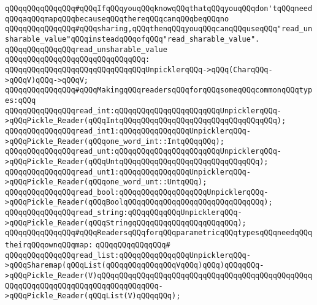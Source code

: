 \newline
\newline
\verb|qQQqqQQqqQQqqQQq#qQQqIfqQQqyouqQQqknowqQQqthatqQQqyouqQQqdon'tqQQqneedqQQqaqQQqmapqQQqbecauseqQQqthereqQQqcanqQQqbeqQQqno|\newline
\verb|qQQqqQQqqQQqqQQq#qQQqsharing,qQQqthenqQQqyouqQQqcanqQQquseqQQq"read_unsharable_value"qQQqinsteadqQQqofqQQq"read_sharable_value".|\newline
\newline
\verb|qQQqqQQqqQQqqQQqread_unsharable_value|\newline
\verb|qQQqqQQqqQQqqQQqqQQqqQQqqQQqqQQq:|\newline
\verb|qQQqqQQqqQQqqQQqqQQqqQQqqQQqqQQqUnpicklerqQQq->qQQq(CharqQQq->qQQqV)qQQq->qQQqV;|\newline
\newline
\newline
\verb|qQQqqQQqqQQqqQQq#qQQqMakingqQQqreadersqQQqforqQQqsomeqQQqcommonqQQqtypes:qQQq|\newline
\newline
\verb|qQQqqQQqqQQqqQQqread_int:qQQqqQQqqQQqqQQqqQQqqQQqUnpicklerqQQq->qQQqPickle_Reader(qQQqIntqQQqqQQqqQQqqQQqqQQqqQQqqQQqqQQqqQQq);|\newline
\verb|qQQqqQQqqQQqqQQqread_int1:qQQqqQQqqQQqqQQqUnpicklerqQQq->qQQqPickle_Reader(qQQqone_word_int::IntqQQqqQQq);|\newline
\verb|qQQqqQQqqQQqqQQqread_unt:qQQqqQQqqQQqqQQqqQQqqQQqUnpicklerqQQq->qQQqPickle_Reader(qQQqUntqQQqqQQqqQQqqQQqqQQqqQQqqQQqqQQq);|\newline
\verb|qQQqqQQqqQQqqQQqread_unt1:qQQqqQQqqQQqqQQqUnpicklerqQQq->qQQqPickle_Reader(qQQqone_word_unt::UntqQQq);|\newline
\verb|qQQqqQQqqQQqqQQqread_bool:qQQqqQQqqQQqqQQqqQQqUnpicklerqQQq->qQQqPickle_Reader(qQQqBoolqQQqqQQqqQQqqQQqqQQqqQQqqQQqqQQq);|\newline
\verb|qQQqqQQqqQQqqQQqread_string:qQQqqQQqqQQqUnpicklerqQQq->qQQqPickle_Reader(qQQqStringqQQqqQQqqQQqqQQqqQQqqQQq);|\newline
\newline
\newline
\newline
\verb|qQQqqQQqqQQqqQQq#qQQqReadersqQQqforqQQqparametricqQQqtypesqQQqneedqQQqtheirqQQqownqQQqmap:|\newline
\verb|qQQqqQQqqQQqqQQq#|\newline
\verb|qQQqqQQqqQQqqQQqread_list:qQQqqQQqqQQqqQQqUnpicklerqQQq->qQQqSharemap(qQQqList(qQQqqQQqqQQqqQQqVqQQq)qQQq)qQQqqQQq->qQQqPickle_Reader(V)qQQqqQQqqQQqqQQqqQQqqQQqqQQqqQQqqQQqqQQqqQQqqQQqqQQqqQQqqQQqqQQqqQQqqQQqqQQqqQQqqQQq->qQQqPickle_Reader(qQQqList(V)qQQqqQQq);|\newline
